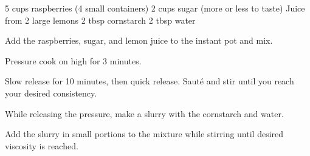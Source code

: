\dishtype{\preserve}
\dishother{\vegetarian}
\begin{ingreds}
    5 cups raspberries (4 small containers)
    2 cups sugar (more or less to taste)
    Juice from 2 large lemons
    2 tbsp cornstarch
    2 tbsp water    
\end{ingreds}
\begin{method}
    Add the raspberries, sugar, and lemon juice to the instant pot and mix.\par
    Pressure cook on high for 3 minutes.\par
    Slow release for 10 minutes, then quick release. Saut\'e and stir until you reach your desired consistency.\par
    While releasing the pressure, make a slurry with the cornstarch and water.\par
    Add the slurry in small portions to the mixture while stirring until desired viscosity is reached.
\end{method}